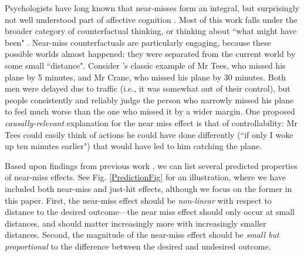 \documentclass[10pt,letterpaper]{article}
\begin{document}
	Psychologists have long known that near-misses form an integral, but surprisingly not well understood part of affective cognition \cite{Johnson1986, Gleicher1990}. Most of this work falls under the broader category of counterfactual thinking, or thinking about ``what might have been" \cite{Bryne2002,McMullen2002, Medvec1997, Roese1997}. Near-miss counterfactuals are particularly engaging, because these possible worlds almost happened: they were separated from the current world by some small ``distance". Consider 's classic example of Mr Tees, who missed his plane by 5 minutes, and Mr Crane, who missed his plane by 30 minutes. Both men were delayed due to traffic (i.e., it was somewhat out of their control), but people consistently and reliably judge the person who narrowly missed his plane to feel much worse than the one who missed it by a wider margin. One proposed \textit{causally-relevant} explanation for the near miss effect is that of controllability: Mr Tees could easily think of actions he could have done differently (``if only I woke up ten minutes earlier") that would have led to him catching the plane.


	Based upon findings from previous work \cite{Kahneman1982, Johnson1986, Gleicher1990}, we can list several predicted properties of near-miss effects. See Fig. \ref{PredictionFig} for an illustration, where we have included both near-miss and just-hit effects, although we focus on the former in this paper. First, the near-miss effect should be \textit{non-linear} with respect to distance to the desired outcome---the near miss effect should only occur at small distances, and should matter increasingly more with increasingly smaller distances. Second, the magnitude of the near-miss effect should be \textit{small but proportional} to the difference between the desired and undesired outcome.
\end{document}
